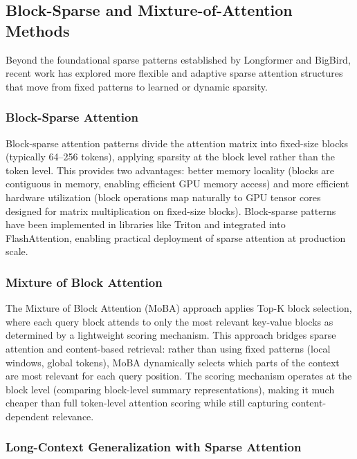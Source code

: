 \documentclass[11pt,letterpaper]{article}
\begin{document}
\subsection{Block-Sparse and Mixture-of-Attention Methods}

Beyond the foundational sparse patterns established by Longformer and BigBird, recent work has explored more flexible and adaptive sparse attention structures that move from fixed patterns to learned or dynamic sparsity.

\subsubsection{Block-Sparse Attention}

Block-sparse attention patterns divide the attention matrix into fixed-size blocks (typically 64--256 tokens), applying sparsity at the block level rather than the token level. This provides two advantages: better memory locality (blocks are contiguous in memory, enabling efficient GPU memory access) and more efficient hardware utilization (block operations map naturally to GPU tensor cores designed for matrix multiplication on fixed-size blocks). Block-sparse patterns have been implemented in libraries like Triton and integrated into FlashAttention, enabling practical deployment of sparse attention at production scale.

\subsubsection{Mixture of Block Attention}

The Mixture of Block Attention (MoBA) approach applies Top-K block selection, where each query block attends to only the most relevant key-value blocks as determined by a lightweight scoring mechanism. This approach bridges sparse attention and content-based retrieval: rather than using fixed patterns (local windows, global tokens), MoBA dynamically selects which parts of the context are most relevant for each query position. The scoring mechanism operates at the block level (comparing block-level summary representations), making it much cheaper than full token-level attention scoring while still capturing content-dependent relevance.

\subsubsection{Long-Context Generalization with Sparse Attention}
\end{document}
